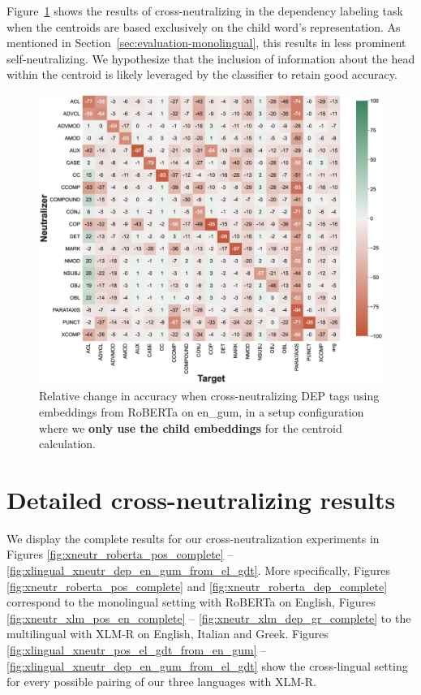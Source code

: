 \documentclass[11pt,a4paper]{article}
\begin{document}
Figure~\ref{fig:xneutr_childonly} shows the results of cross-neutralizing in the dependency labeling task when the centroids are based exclusively on the child word's representation. As mentioned in Section~\ref{sec:evaluation-monolingual}, this results in less prominent self-neutralizing. We hypothesize that the inclusion of information about the head within the centroid is likely leveraged by the classifier to retain good accuracy.

\begin{figure}[p]
    \centering
    \includegraphics[width=\textwidth]{full_figures/DEP_child_only_roberta-base_en_gum_acc_drop_agg=mean_probe=3.eps}
    \caption{Relative change in accuracy when cross-neutralizing DEP tags using embeddings from RoBERTa on en\_gum, in a setup configuration where we \textbf{only use the child embeddings} for the centroid calculation.}
    \label{fig:xneutr_childonly}
\end{figure}

\section{Detailed cross-neutralizing results}
\label{app:full_xneutr}
We display the complete results for our cross-neutralization experiments in Figures \ref{fig:xneutr_roberta_pos_complete} -- \ref{fig:xlingual_xneutr_dep_en_gum_from_el_gdt}. More specifically, Figures \ref{fig:xneutr_roberta_pos_complete} and  
\ref{fig:xneutr_roberta_dep_complete} correspond to the monolingual setting with RoBERTa on English, Figures \ref{fig:xneutr_xlm_pos_en_complete} -- \ref{fig:xneutr_xlm_dep_gr_complete} to the multilingual with XLM-R on English, Italian and Greek. Figures \ref{fig:xlingual_xneutr_pos_el_gdt_from_en_gum} -- \ref{fig:xlingual_xneutr_dep_en_gum_from_el_gdt} show the cross-lingual setting for every possible pairing of our three languages with XLM-R.
\end{document}
